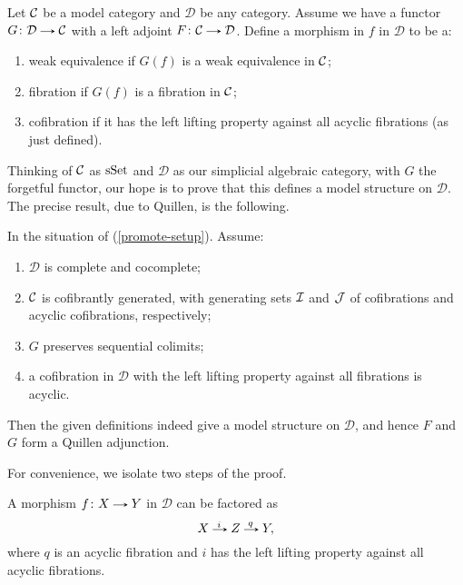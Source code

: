 \renewcommand{\D}{\mathcal{D}}

\begin{nothing}
  \label{promote-setup}
  Let $\mathcal{C}$ be a model category and $\D$ be any category. Assume we
  have a functor $G \c \D \to \C$ with a left adjoint $F \c \C \to
  \D$. Define a morphism in $f$ in $\D$ to be a:
  \begin{enumerate}
  \item weak equivalence if $G(f)$ is a weak equivalence in $\mathcal{C}$;
  \item fibration if $G(f)$ is a fibration in $\mathcal{C}$;
  \item cofibration if it has the left lifting property against all
    acyclic fibrations (as just defined).
  \end{enumerate}
  Thinking of $\mathcal{C}$ as $\mathrm{s}\mathrm{Set}$ and $\D$ as our simplicial algebraic
  category, with $G$ the forgetful functor, our hope is to prove that
  this defines a model structure on $\D$. The precise result, due to
  Quillen, is the following.
\end{nothing}

\begin{theorem}
  \label{promote-thm}
  In the situation of (\ref{promote-setup}). Assume:
  \begin{enumerate}
  \item $\D$ is complete and cocomplete;
  \item $\mathcal{C}$ is cofibrantly generated, with generating sets $\mathcal{I}$ and
    $\mathcal{J}$ of cofibrations and acyclic cofibrations, respectively;
  \item \label{seqcolim} $G$ preserves sequential colimits;
  \item \label{accof} a cofibration in $\D$ with the left lifting
    property against all fibrations is acyclic.
  \end{enumerate}
  Then the given definitions indeed give a model structure on $\D$,
  and hence $F$ and $G$ form a Quillen adjunction.
\end{theorem}

For convenience, we isolate two steps of the proof.

\begin{lemma}
  \label{factor1}
  A morphism $f \c X \to Y$ in $\D$ can be factored as
  \[
  X \lblto{i} Z \lblto{q} Y,
  \]
  where $q$ is an acyclic fibration and $i$ has the left lifting
  property against all acyclic fibrations.
\end{lemma}

